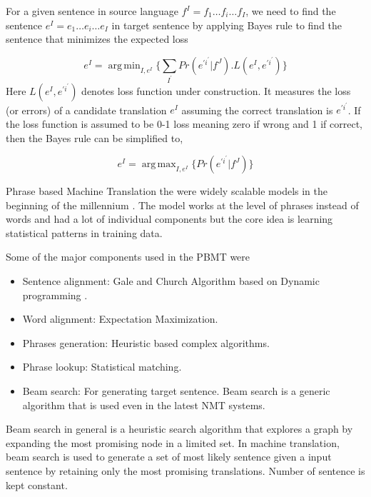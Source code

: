 \documentclass[conference]{IEEEtran}
\DeclareMathOperator*{\argmin}{arg\,min}
\DeclareMathOperator*{\argmax}{arg\,max}
\begin{document}
For a given sentence in source language $f^{I} = f_1\ldots f_i\ldots f_{I}  $, we need to find the sentence $e^{I} = e_1\ldots e_i\ldots e_{I}  $ in target sentence by applying Bayes rule to find the sentence that minimizes the expected loss

$$ e^{I} =  \argmin_{I,e^{I}} \Bigg\{  \sum_{I^{'} }   Pr(e^{'i^'} | f^J) .L(e^I,e^{'i^'})  \Bigg\} $$ Here 
$ L(e^I,e^{'i^'}) $ denotes loss function under construction.  It measures the loss (or errors) of a candidate translation $e^{I}$
assuming the correct translation is $e^{'i^'} $. If the loss function is assumed to be 0-1 loss meaning zero if wrong and 1 if correct, then the Bayes rule can be simplified to,


$$ e^{I} =  \argmax_{I,e^{I}}  \Bigg\{  Pr(e^{'i^'} | f^J) \Bigg\} $$

Phrase based Machine Translation the were widely scalable models in the beginning of the millennium \cite{koehn2003statistical}. The model works at the level of phrases instead of words and had a lot of individual components but the core idea is learning statistical patterns in training data.

Some of the major components used in the PBMT were 
\begin{itemize}
 
 \item  Sentence alignment: Gale and Church Algorithm based on Dynamic programming \cite{lewis1994sequential}.
 \item  Word alignment: Expectation Maximization.
 \item  Phrases generation: Heuristic based complex algorithms.
 \item  Phrase lookup: Statistical matching.
 \item  Beam search: For generating target sentence. Beam search is a generic algorithm that is used even in the latest NMT systems.
\end{itemize}
 Beam search in general is a heuristic search algorithm that explores a graph by expanding the most promising node in a limited set. In machine translation, beam search is used to generate a set of most likely sentence given a input sentence by retaining only the most promising translations. Number of sentence is kept constant.  
\end{document}
